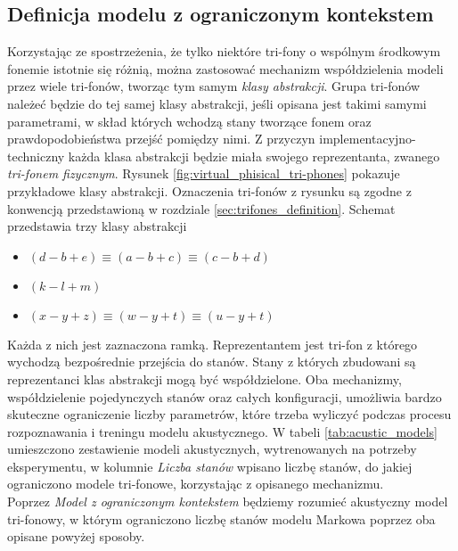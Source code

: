 \documentclass[shortabstract, mgr]{iithesis}
\begin{document}
	\subsection{ Definicja modelu z ograniczonym kontekstem }
		\label{sec:tri-fone_mapping}
		Korzystając ze spostrzeżenia, że tylko niektóre tri-fony o wspólnym środkowym fonemie istotnie się różnią, można zastosować mechanizm współdzielenia modeli przez wiele tri-fonów, tworząc tym samym \textit{klasy abstrakcji}. Grupa tri-fonów należeć będzie do tej samej klasy abstrakcji, jeśli opisana jest takimi samymi parametrami, w skład których wchodzą stany tworzące fonem oraz prawdopodobieństwa przejść pomiędzy nimi. Z przyczyn implementacyjno-techniczny każda klasa abstrakcji będzie miała swojego reprezentanta, zwanego \textit{tri-fonem fizycznym}. Rysunek \ref{fig:virtual_phisical_tri-phones} pokazuje przykładowe klasy abstrakcji. Oznaczenia tri-fonów z rysunku są zgodne z konwencją przedstawioną w rozdziale \ref{sec:trifones_definition}. Schemat przedstawia trzy klasy abstrakcji 
		\begin{itemize}
			\item $(d-b+e) \equiv (a-b+c) \equiv (c-b+d)$
			\item $(k-l+m)$ 
			\item $(x-y+z) \equiv (w-y+t) \equiv (u-y+t)$
		\end{itemize} 
		Każda z nich jest zaznaczona ramką. Reprezentantem jest tri-fon z którego wychodzą bezpośrednie przejścia do stanów. Stany z których zbudowani są reprezentanci klas abstrakcji mogą być współdzielone. Oba mechanizmy, współdzielenie pojedynczych stanów oraz całych konfiguracji, umożliwia bardzo skuteczne ograniczenie liczby parametrów, które trzeba wyliczyć podczas procesu rozpoznawania i treningu modelu akustycznego. W tabeli \ref{tab:acustic_models} umieszczono zestawienie modeli akustycznych, wytrenowanych na potrzeby eksperymentu, w kolumnie \textit{Liczba stanów} wpisano liczbę stanów, do jakiej ograniczono modele tri-fonowe, korzystając z opisanego mechanizmu. \\
		Poprzez \textit{Model z ograniczonym kontekstem} będziemy rozumieć akustyczny model tri-fonowy, w którym ograniczono liczbę stanów modelu Markowa poprzez oba opisane powyżej sposoby.
		
\end{document}
